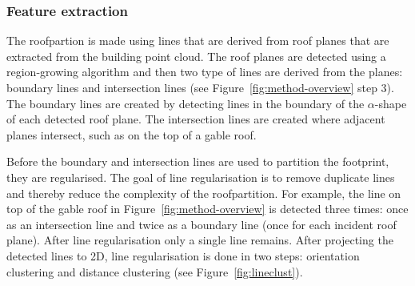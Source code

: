 \subsubsection{Feature extraction}
The roofpartion is made using lines that are derived from roof planes that are extracted from the building point cloud.
The roof planes are detected using a region-growing algorithm and then two type of lines are derived from the planes: boundary lines and intersection lines (see Figure~\ref{fig:method-overview} step 3).
The boundary lines are created by detecting lines in the boundary of the $\alpha$-shape of each detected roof plane.
The intersection lines are created where adjacent planes intersect, such as on the top of a gable roof.

Before the boundary and intersection lines are used to partition the footprint, they are regularised.
The goal of line regularisation is to remove duplicate lines and thereby reduce the complexity of the roofpartition.
For example, the line on top of the gable roof in Figure~\ref{fig:method-overview} is detected three times: once as an intersection line and twice as a boundary line (once for each incident roof plane).
After line regularisation only a single line remains.
After projecting the detected lines to 2D, line regularisation is done in two steps: orientation clustering and distance clustering (see Figure~\ref{fig:lineclust}).

